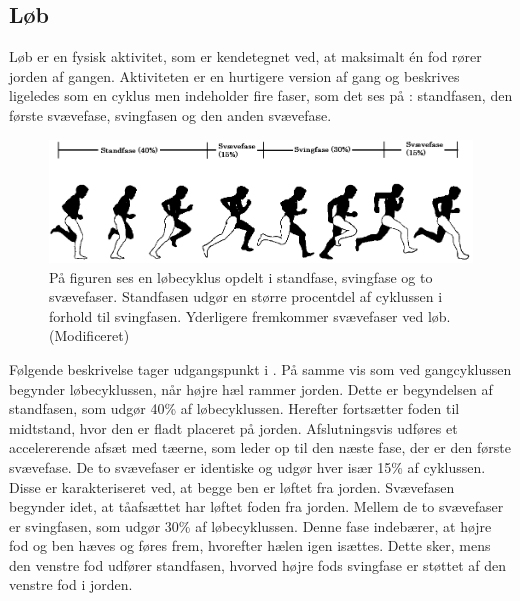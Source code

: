 \subsection{Løb}
Løb er en fysisk aktivitet, som er kendetegnet ved, at maksimalt én fod rører jorden af gangen. Aktiviteten er en hurtigere version af gang og beskrives ligeledes som en cyklus men indeholder fire faser, som det ses på : standfasen, den første svævefase, svingfasen og den anden svævefase. \citep{Adelaar1986,Novacheck1998}
\begin{figure}[H]
	\centering
	\includegraphics[scale=0.4]{figures/bProblemloesning/loeb_cyklus1.png}
	\caption{På figuren ses en løbecyklus opdelt i standfase, svingfase og to svævefaser. Standfasen udgør en større procentdel af cyklussen i forhold til svingfasen. Yderligere fremkommer svævefaser ved løb. \citep{Adelaar1986} (Modificeret)}
	\label{fig:loebecyklus}
\end{figure}\vspace{-0.25cm}
Følgende beskrivelse tager udgangspunkt i . På samme vis som ved gangcyklussen begynder løbecyklussen, når højre hæl rammer jorden. Dette er begyndelsen af standfasen, som udgør 40\% af løbecyklussen. Herefter fortsætter foden til midtstand, hvor den er fladt placeret på jorden. Afslutningsvis udføres et accelererende afsæt med tæerne, som leder op til den næste fase, der er den første svævefase. \citep{Adelaar1986,Novacheck1998} \newline 
De to svævefaser er identiske og udgør hver især 15\% af cyklussen. Disse er karakteriseret ved, at begge ben er løftet fra jorden. Svævefasen begynder idet, at tåafsættet har løftet foden fra jorden. Mellem de to svævefaser er svingfasen, som udgør 30\% af løbecyklussen. Denne fase indebærer, at højre fod og ben hæves og føres frem, hvorefter hælen igen isættes. Dette sker, mens den venstre fod udfører standfasen, hvorved højre fods svingfase er støttet af den venstre fod i jorden. \citep{Adelaar1986,Novacheck1998} %

